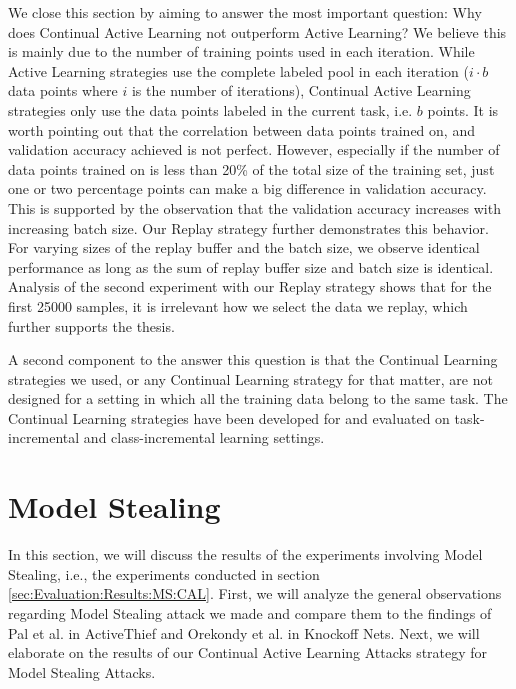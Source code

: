 We close this section by aiming to answer the most important question: Why does Continual Active Learning not outperform Active Learning? We believe this is mainly
due to the number of training points used in each iteration. While Active Learning strategies use the complete labeled pool in each iteration ($i \cdot b$ data
points where $i$ is the number of iterations), Continual Active Learning strategies only use the data points labeled in the current task, i.e. $b$ points.
It is worth pointing out that the correlation between data points trained on, and validation accuracy achieved is not perfect. However, especially if the
number of data points trained on is less than 20\% of the total size of the training set, just one or two percentage points can make a big difference in validation
accuracy. This is supported by the observation that the validation accuracy increases with increasing batch size. Our Replay strategy further demonstrates this behavior.
For varying sizes of the replay buffer and the batch size, we observe identical performance as long as the sum of replay buffer size and batch size is identical. Analysis
of the second experiment with our Replay strategy shows that for the first 25000 samples, it is irrelevant how we select the data we replay, which further supports the thesis. \par
A second component to the answer this question is that the Continual Learning strategies we used, or any Continual Learning strategy for that matter, are not
designed for a setting in which all the training data belong to the same task. The Continual Learning strategies have been developed for and evaluated on task-incremental
and class-incremental learning settings.


\section{Model Stealing}
\label{sec:Discussion:ModelStealing}
In this section, we will discuss the results of the experiments involving Model Stealing, i.e., the experiments conducted in section \ref{sec:Evaluation:Results:MS:CAL}.
First, we will analyze the general observations regarding Model Stealing attack we made and compare them to the findings of Pal et al. in ActiveThief and Orekondy
et al. in Knockoff Nets. Next, we will elaborate on the results of our Continual Active Learning Attacks strategy for Model Stealing Attacks.

